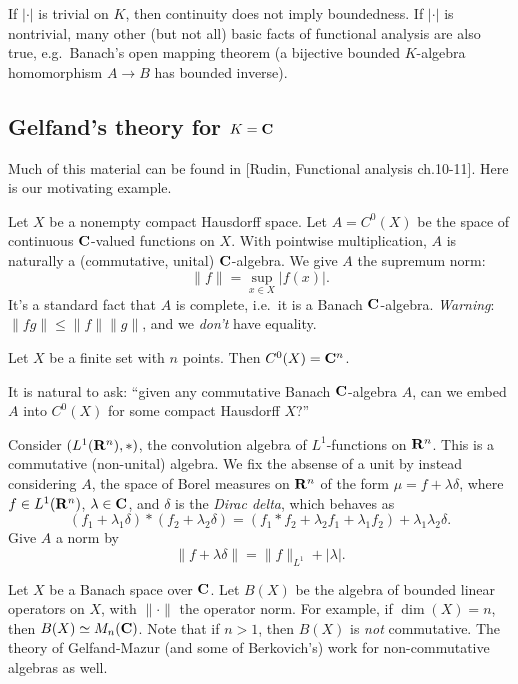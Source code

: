 If $|\cdot|$ is trivial on $K$, then continuity does not imply boundedness. If 
$|\cdot|$ is nontrivial, many other (but not all) basic facts of functional 
analysis are also true, e.g.~Banach's open mapping theorem (a bijective bounded 
$K$-algebra homomorphism $A\to B$ has bounded inverse). 





\subsection{Gelfand's theory for \texorpdfstring{$K=\mathbf{C}$}{K=C}}

Much of this material can be found in [Rudin, Functional analysis ch.10-11].
Here is our motivating example. 

\begin{example}
Let $X$ be a nonempty compact Hausdorff space. Let $A=C^0(X)$ be the space of 
continuous $\mathbf{C}$-valued functions on $X$. With pointwise multiplication, $A$ is 
naturally a (commutative, unital) $\mathbf{C}$-algebra. We give $A$ the supremum norm: 
\[
  \|f\| = \sup_{x\in X} |f(x)| .
\]
It's a standard fact that $A$ is complete, i.e.~it is a Banach $\mathbf{C}$-algebra.
\emph{Warning}: $\|fg\|\leqslant \|f\|\|g\|$, and we \emph{don't} have 
equality. 
\end{example}

\begin{example}
Let $X$ be a finite set with $n$ points. Then $C^0(X)=\mathbf{C}^n$. 
\end{example}

It is natural to ask: ``given any commutative Banach $\mathbf{C}$-algebra $A$, can we 
embed $A$ into $C^0(X)$ for some compact Hausdorff $X$?''

\begin{example}
Consider $(L^1(\mathbf{R}^n),\ast)$, the convolution algebra of $L^1$-functions on 
$\mathbf{R}^n$. This is a commutative (non-unital) algebra. We fix the absense of a 
unit by instead considering $A$, the space of Borel measures on $\mathbf{R}^n$ of the 
form $\mu=f+\lambda\delta$, where $f\in L^1(\mathbf{R}^n)$, $\lambda\in \mathbf{C}$, and 
$\delta$ is the \emph{Dirac delta}, which behaves as 
\[
  (f_1+\lambda_1\delta) \ast (f_2+\lambda_2 \delta) = (f_1\ast f_2+\lambda_2 f_1 + \lambda_1 f_2) + \lambda_1 \lambda_2 \delta .
\]
Give $A$ a norm by 
\[
  \|f+\lambda\delta\| = \|f\|_{L^1} + |\lambda| .
\]
\end{example}

\begin{example}
Let $X$ be a Banach space over $\mathbf{C}$. Let $B(X)$ be the algebra of bounded 
linear operators on $X$, with $\|\cdot\|$ the operator norm. For example, if 
$\dim(X)=n$, then $B(X)\simeq M_n(\mathbf{C})$. Note that if $n>1$, then $B(X)$ is 
\emph{not} commutative. The theory of Gelfand-Mazur (and some of Berkovich's) 
work for non-commutative algebras as well. 
\end{example}

